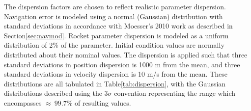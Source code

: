 The dispersion factors are chosen to reflect realistic parameter dispersion. Navigation error is modeled using a normal (Gaussian) distribution with standard deviations in accordance with Moesser's 2010\:\cite{MOESSER} work as described in Section\:\ref{sec:navmod}. Rocket parameter dispersion is modeled as a uniform distribution of 2\% of the parameter. Initial condition values are normally distributed about their nominal values. The dispersion is applied such that three standard deviations in position dispersion is 1000 m from the mean, and three standard deviations in velocity dispersion is 10 m/s from the mean. These distributions are all tabulated in Table\:\ref{tab:dispersion}, with the Gaussian distributions described using the $3\sigma$ convention representing the range which encompasses $\approx\:99.7\%$ of resulting values. 

